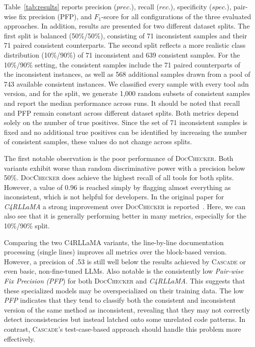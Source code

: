 \documentclass[acmsmall, screen]{acmart}
\newcommand{\tool}{\textsc{Cascade}\xspace}
\begin{document}
Table~\ref{tab:results} reports precision ($prec.$), recall ($rec.$), specificity ($spec.$), pair-wise fix precision (PFP), and $F_1$-score for all configurations of the three evaluated approaches. In addition, results are presented for two different dataset splits. The first split is balanced (50\%/50\%), consisting of 71 inconsistent samples and their 71 paired consistent counterparts. The second split reflects a more realistic class distribution (10\%/90\%) of 71 inconsistent and 639 consistent samples.
For the 10\%/90\% setting, the consistent samples include the 71 paired counterparts of the inconsistent instances, as well as 568 additional samples drawn from a pool of 743 available consistent instances. We classified every sample with every tool adn version, and for the split, we generate 1,000 random subsets of consistent samples and report the median performance across runs.
It should be noted that recall and PFP remain constant across different dataset splits. Both metrics depend solely on the number of true positives. Since the set of 71 inconsistent samples is fixed and no additional true positives can be identified by increasing the number of consistent samples, these values do not change across splits.


The first notable observation is the poor performance of \textsc{DocChecker}. 
Both variants exhibit worse than random discriminative power with a precision below 50\%. \textsc{DocChecker} does achieve the highest recall of all tools for both splits. However, a value of 0.96 is reached simply by flagging almost everything as inconsistent, which is not helpful for developers. In the original paper for \textit{C4RLLaMA} a strong improvement over \textsc{DocChecker} is reported~\cite{carlama}.  Here, we can also see that it is generally performing better in many metrics, especially for the 10\%/90\% split.

Comparing the two C4RLLaMA variants, the line-by-line documentation processing (single lines) improves all metrics over the block-based version. However, a precision of .53 is still well below the results achieved by \tool or even basic, non-fine-tuned LLMs. Also notable is the consistently low \textit{Pair-wise Fix Precision} \textit{(PFP}) for both \textsc{DocChecker} and \textit{C4RLLaMA}. This suggests that these specialized models may be overspecialized on their training data. The low \textit{PFP} indicates that they tend to classify both the consistent and inconsistent version of the same method as inconsistent, revealing that they may not correctly detect inconsistencies but instead latched onto some unrelated code patterns. In contrast, \tool’s test-case-based approach should handle this problem more effectively.
\end{document}
